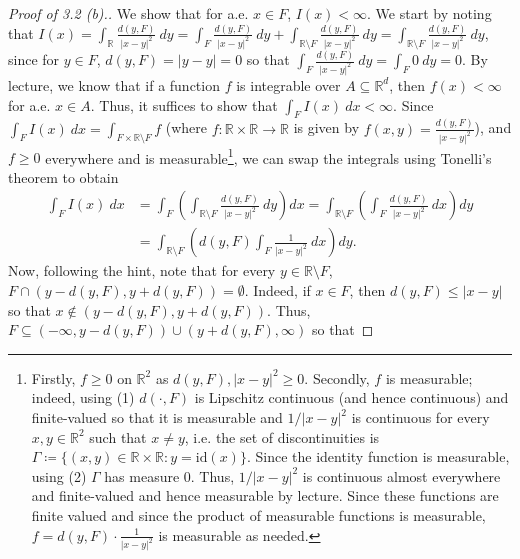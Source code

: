 \begin{proof}[Proof of 3.2 (b).]
	We show that for a.e. \( x \in F \), \( I(x) < \infty \). We start by noting that \( I(x) = \int_{\mathbb{R}} \frac{d(y,F)}{|x-y|^{2} } \ dy = \int_{F} \frac{d(y,F)}{|x-y|^{2} } \ dy + \int_{\mathbb{R} \setminus F} \frac{d(y, F)}{|x-y|^{2} } \ dy = \int_{\mathbb{R} \setminus F} \frac{d(y,F)}{|x-y|^{2} }  \ dy \), since for \( y \in F \), \( d(y, F) = |y-y| = 0 \) so that \( \int_{F} \frac{d(y,F)}{|x-y|^{2} }  \ dy= \int_{F} 0 \ dy= 0 \). By lecture, we know that if a function \( f \) is integrable over \( A \subseteq \mathbb{R}^{d}  \), then \( f(x) < \infty \) for a.e. \( x \in A \). Thus, it suffices to show that \( \int_{F} I(x) \ dx < \infty \). Since \( \int_{F} I(x) \ dx = \int_{F \times \mathbb{R} \setminus F} f \) (where \( f : \mathbb{R} \times \mathbb{R} \to \mathbb{R} \) is given by \( f(x,y) = \frac{d(y,F)}{|x-y|^{2} }  \)), and \( f \geq 0 \) everywhere and is measurable\footnote{Firstly, \( f \geq 0 \) on \( \mathbb{R}^{2}  \) as \( d(y,F), |x-y|^{2}  \geq 0 \). Secondly, \( f \) is measurable; indeed, using (1) \( d(\cdot , F) \) is Lipschitz continuous (and hence continuous) and finite-valued so that it is measurable and \( 1/|x-y|^{2}  \) is continuous for every \( x,y \in \mathbb{R}^{2}  \) such that \( x \neq  y \), i.e. the set of discontinuities is \( \Gamma \coloneqq \{ (x,y) \in \mathbb{R} \times \mathbb{R}  :  y = \mbox{id}(x)  \}  \). Since the identity function is measurable, using (2) \( \Gamma \) has measure 0. Thus, \( 1/|x-y|^{2}  \) is continuous almost everywhere and finite-valued and hence measurable by lecture. Since these functions are finite valued and since the product of measurable functions is measurable, \( f = d(y,F)\cdot \frac{1}{|x-y|^{2} }  \) is measurable as needed.}, we can swap the integrals using Tonelli's theorem to obtain
\begin{align*}
	\int_{F} I(x) \ dx &= \int_{F} \left ( {\int_{\mathbb{R} \setminus F}  \frac{d(y,F)}{|x-y|^{2} } \ dy } \right ) dx = \int_{\mathbb{R} \setminus F} \left ( {\int_{F} \frac{d(y,F)}{|x-y|^{2} } \ dx} \right ) dy \\
			   &= \int_{\mathbb{R}\setminus F} \left ( d(y,F) \int_{F} \frac{1}{|x-y|^{2} } \ dx \right ) dy. \tag{$\ast$}
\end{align*}
Now, following the hint, note that for every \( y \in \mathbb{R} \setminus F \), \( F \cap (y - d(y,F), y + d(y,F)) = \emptyset  \). Indeed, if \( x \in F \), then \( d(y, F) \leq |x - y| \) so that \( x \notin (y - d(y,F), y+ d(y,F)) \). Thus, \( F \subseteq (-\infty, y - d(y, F)) \cup (y+d(y,F), \infty) \) so that

\end{proof}
